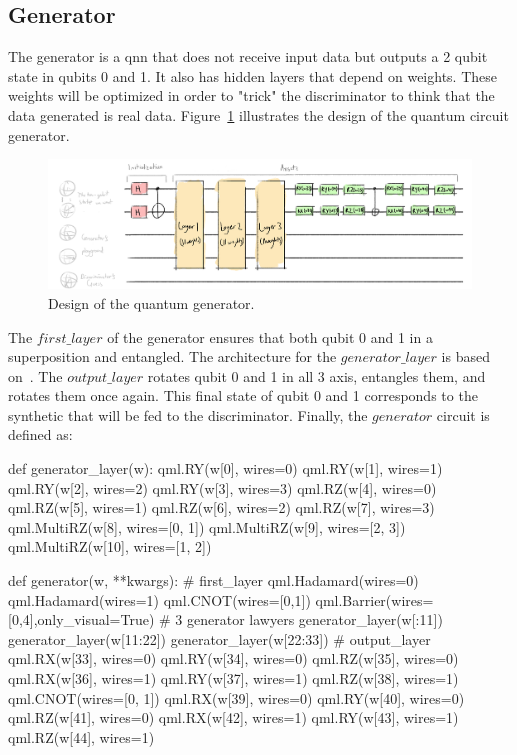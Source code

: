 \subsection{Generator}
\label{sec:gen}

The generator is a \gls{qnn} that does not receive input data but outputs a 2 
qubit state in qubits 0 and 1. It also has hidden layers that depend on weights.
These weights will be optimized in order to "trick" the discriminator to think 
that the data generated is real data. Figure~\ref{fig:gen} illustrates the 
design of the quantum circuit generator.

\begin{figure}[!htbp]
\centering
    \includegraphics[width=1\textwidth]{figures/generator.pdf}
\caption{Design of the quantum generator.}
\label{fig:gen}
\end{figure}


The $first\_layer$ of the generator ensures that both qubit 0 and 1 in a 
superposition and entangled. The architecture for the $generator\_layer$ is based 
on~\cite{generator}. The $output\_layer$ rotates qubit 0 and 1 in all 3 axis,
entangles them, and rotates them once again. This final state of qubit 0 and 1
corresponds to the synthetic that will be fed to the discriminator. Finally, the
$generator$ circuit is defined as:
\begin{python}
def generator_layer(w):
    qml.RY(w[0], wires=0)
    qml.RY(w[1], wires=1)
    qml.RY(w[2], wires=2)
    qml.RY(w[3], wires=3)
    qml.RZ(w[4], wires=0)
    qml.RZ(w[5], wires=1)
    qml.RZ(w[6], wires=2)
    qml.RZ(w[7], wires=3)
    qml.MultiRZ(w[8], wires=[0, 1])
    qml.MultiRZ(w[9], wires=[2, 3])
    qml.MultiRZ(w[10], wires=[1, 2])

def generator(w, **kwargs):
    # first_layer
    qml.Hadamard(wires=0)
    qml.Hadamard(wires=1)
    qml.CNOT(wires=[0,1])
    qml.Barrier(wires=[0,4],only_visual=True)
    # 3 generator lawyers
    generator_layer(w[:11])
    generator_layer(w[11:22])
    generator_layer(w[22:33])
    # output_layer
    qml.RX(w[33], wires=0)
    qml.RY(w[34], wires=0)
    qml.RZ(w[35], wires=0)
    qml.RX(w[36], wires=1)
    qml.RY(w[37], wires=1)
    qml.RZ(w[38], wires=1)
    qml.CNOT(wires=[0, 1])
    qml.RX(w[39], wires=0)
    qml.RY(w[40], wires=0)
    qml.RZ(w[41], wires=0)
    qml.RX(w[42], wires=1)
    qml.RY(w[43], wires=1)
    qml.RZ(w[44], wires=1)
\end{python}


